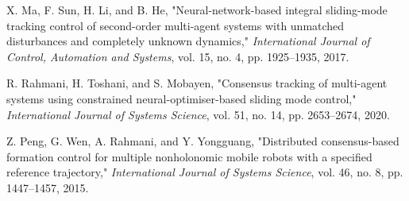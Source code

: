 \documentclass[journal,onecolumn]{IEEEtran}
\begin{document}
\begin{thebibliography}{99}
    X. Ma, F. Sun, H. Li, and B. He, "Neural-network-based integral sliding-mode tracking control of second-order multi-agent systems with unmatched disturbances and completely unknown dynamics," \textit{International Journal of Control, Automation and Systems}, vol. 15, no. 4, pp. 1925–1935, 2017.

    R. Rahmani, H. Toshani, and S. Mobayen, "Consensus tracking of multi-agent systems using constrained neural-optimiser-based sliding mode control," \textit{International Journal of Systems Science}, vol. 51, no. 14, pp. 2653–2674, 2020.

    Z. Peng, G. Wen, A. Rahmani, and Y. Yongguang, "Distributed consensus-based formation control for multiple nonholonomic mobile robots with a specified reference trajectory," \textit{International Journal of Systems Science}, vol. 46, no. 8, pp. 1447–1457, 2015.
    
    \end{thebibliography}
    
\end{document}
